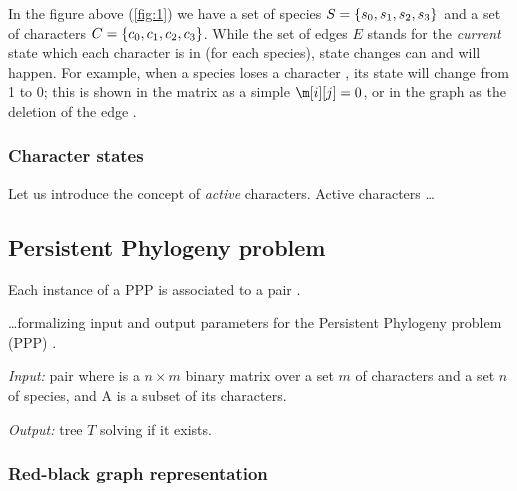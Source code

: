 In the figure above (\ref{fig:1}) we have a set of species $S = \{ \species[0], \species[1], \species[2], \species[3] \}$ and a set of characters $C = \{ \character[0], \character[1], \character[2], \character[3] \}$.
While the set of edges $E$ stands for the \emph{current} state which each character is in (for each species), state changes can and will happen.
For example, when a species \species[i] loses a character \character[j], its state will change from 1 to 0; this is shown in the matrix as a simple $\m[i][j] = 0$, or in the graph as the deletion of the edge \edge{\species[i]}{\character[j]}.

\subsubsection{Character states}\label{sssec:charstates}


Let us introduce the concept of \textit{active} characters.
Active characters  \dots

\subsection{Persistent Phylogeny problem}\label{ssec:ppp}


Each instance of a PPP is associated to a pair \ma{}.

 \dots formalizing input and output parameters for the Persistent Phylogeny problem (PPP) \cite{Bonizzoni2016SolvingTP}.

\begin{definition}\label{def:ppp}
  \text{}

  \textit{Input:} pair \ma{} where \m{} is a $n \times m$ binary matrix over a set $m$ of characters and a set $n$ of species, and A is a subset of its characters.

  \textit{Output:} tree $T$ solving \m{} if it exists.
\end{definition}

\subsubsection{Red-black graph representation}\label{sssec:grb}

